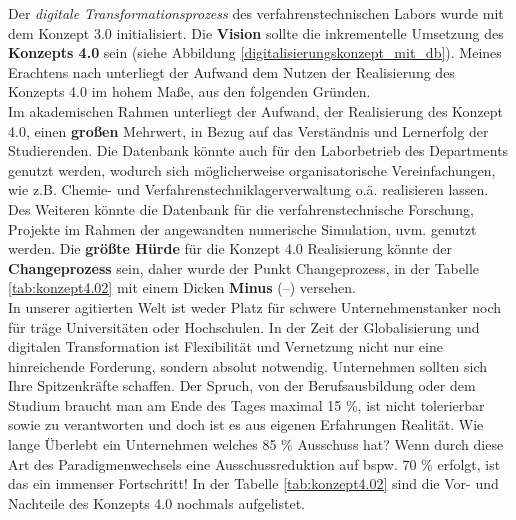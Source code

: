 Der \textit{digitale Transformationsprozess} des verfahrenstechnischen Labors wurde mit dem Konzept 3.0 initialisiert. Die \textbf{{\Hypatia Vision}} sollte die inkrementelle Umsetzung des \textbf{{\Hypatia Konzepts 4.0}} sein (siehe Abbildung \ref{digitalisierungskonzept_mit_db}). Meines Erachtens nach unterliegt der Aufwand dem Nutzen der Realisierung des Konzepts 4.0  im hohem Maße, aus den folgenden Gründen. \\

Im akademischen Rahmen unterliegt der Aufwand, der Realisierung des {\Hypatia Konzept 4.0}, einen \textbf{großen} Mehrwert, in Bezug auf das Verständnis und Lernerfolg der Studierenden. Die Datenbank könnte auch für den Laborbetrieb des Departments genutzt werden, wodurch sich möglicherweise organisatorische Vereinfachungen, wie z.B. Chemie- und Verfahrenstechniklagerverwaltung o.ä. realisieren lassen. Des Weiteren könnte die Datenbank für die verfahrenstechnische Forschung, Projekte im Rahmen der angewandten numerische Simulation, uvm. genutzt werden. Die \textbf{größte Hürde} für die {\Hypatia Konzept 4.0} Realisierung könnte der \textbf{Changeprozess} sein, daher wurde der Punkt Changeprozess, in der Tabelle \ref{tab:konzept4.02} mit einem Dicken \textbf{Minus} (--) versehen.\\

In unserer agitierten Welt ist weder Platz für schwere Unternehmenstanker noch für träge Universitäten oder Hochschulen. In der Zeit der Globalisierung und digitalen Transformation ist Flexibilität und Vernetzung nicht nur eine hinreichende Forderung, sondern absolut notwendig. Unternehmen sollten sich Ihre Spitzenkräfte schaffen. Der Spruch, \glqq von der Berufsausbildung oder dem Studium braucht man am Ende des Tages maximal 15 \%\grqq , ist nicht tolerierbar sowie zu verantworten und doch ist es aus eigenen Erfahrungen Realität. Wie lange Überlebt ein Unternehmen welches 85 \% Ausschuss hat? Wenn durch diese Art des Paradigmenwechsels eine Ausschussreduktion auf bspw. 70 \% erfolgt, ist das ein immenser Fortschritt! 
In der Tabelle \ref{tab:konzept4.02} sind die Vor- und Nachteile des Konzepts 4.0 nochmals aufgelistet.\\

